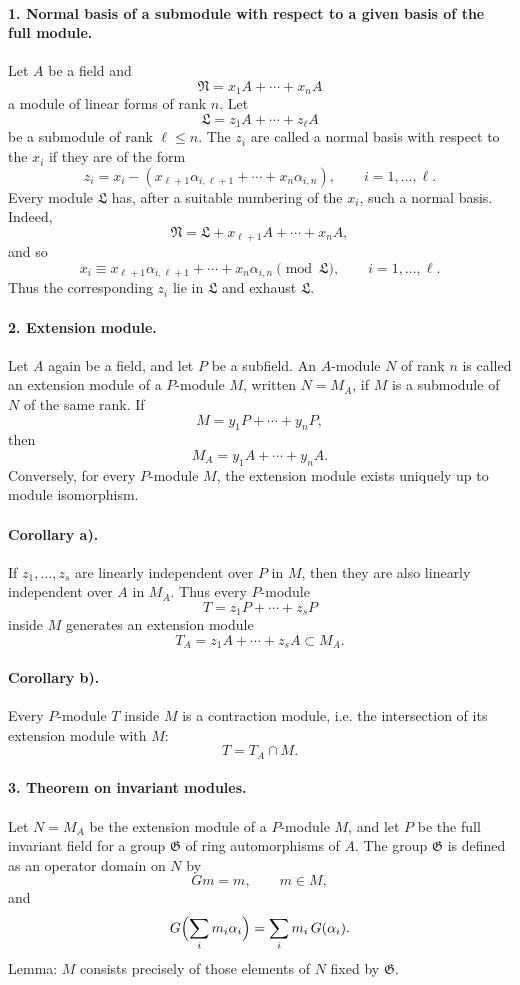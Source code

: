 \documentclass[11pt]{article}
\providecommand{\frN}{\mathfrak N}
\providecommand{\frG}{\mathfrak G}
\providecommand{\frL}{\mathfrak L}
\begin{document}
\paragraph{1. Normal basis of a submodule with respect to a given basis of the full module.}
Let \(A\) be a field and
\[
        \frN=x_1A+\cdots+x_nA
\]
a module of linear forms of rank \(n\). Let
\[
        \frL=z_1A+\cdots+z_\ell A
\]
be a submodule of rank \(\ell\le n\). The \(z_i\) are called a normal basis with respect to the \(x_i\) if they are of the form
\[
        z_i=x_i-(x_{\ell+1}\alpha_{i,\ell+1}+\cdots+x_n\alpha_{i,n}),
        \qquad i=1,\ldots,\ell.
\]
Every module \(\frL\) has, after a suitable numbering of the \(x_i\), such a normal basis. Indeed,
\[
        \frN=\frL+x_{\ell+1}A+\cdots+x_nA,
\]
and so
\[
        x_i\equiv x_{\ell+1}\alpha_{i,\ell+1}+\cdots+x_n\alpha_{i,n}
        \pmod{\frL},\qquad i=1,\ldots,\ell.
\]
Thus the corresponding \(z_i\) lie in \(\frL\) and exhaust \(\frL\).

\paragraph{2. Extension module.}
Let \(A\) again be a field, and let \(P\) be a subfield. An \(A\)-module \(N\) of rank \(n\) is called an extension module of a \(P\)-module \(M\), written \(N=M_A\), if \(M\) is a submodule of \(N\) of the same rank. If
\[
        M=y_1P+\cdots+y_nP,
\]
then
\[
        M_A=y_1A+\cdots+y_nA.
\]
Conversely, for every \(P\)-module \(M\), the extension module exists uniquely up to module isomorphism.

\paragraph{Corollary a).}
If \(z_1,\ldots,z_s\) are linearly independent over \(P\) in \(M\), then they are also linearly independent over \(A\) in \(M_A\). Thus every \(P\)-module
\[
        T=z_1P+\cdots+z_sP
\]
inside \(M\) generates an extension module
\[
        T_A=z_1A+\cdots+z_sA\subset M_A.
\]

\paragraph{Corollary b).}
Every \(P\)-module \(T\) inside \(M\) is a contraction module, i.e. the intersection of its extension module with \(M\):
\[
        T=T_A\cap M .
\]

\paragraph{3. Theorem on invariant modules.}
Let \(N=M_A\) be the extension module of a \(P\)-module \(M\), and let \(P\) be the full invariant field for a group \(\frG\) of ring automorphisms of \(A\). The group \(\frG\) is defined as an operator domain on \(N\) by
\[
        Gm=m,\qquad m\in M,
\]
and
\[
        G\Bigl(\sum_i m_i\alpha_i\Bigr)=\sum_i m_i\,G(\alpha_i).
\]
Lemma: \(M\) consists precisely of those elements of \(N\) fixed by \(\frG\).
\end{document}
